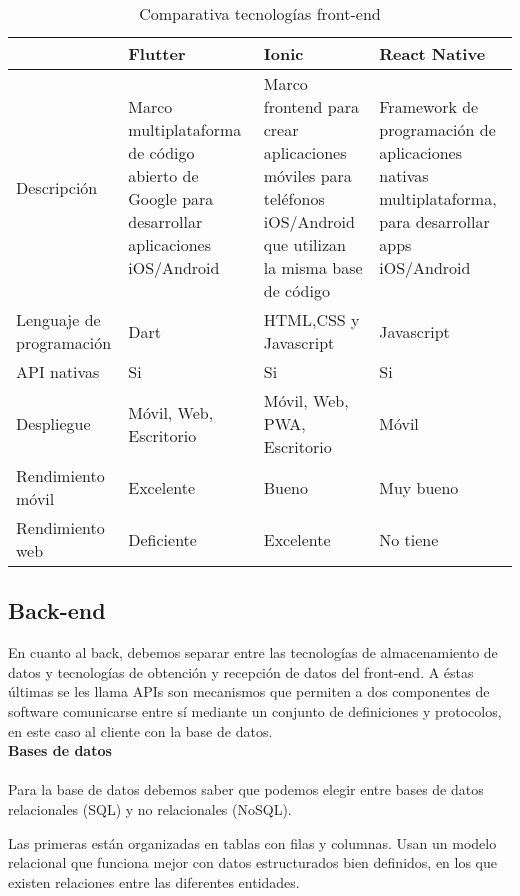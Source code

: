 \begin{table}[H] %
    \centering
    \begin{tabular}{|p{2cm} |p{4 cm} |p{4cm} |p{4cm} |} \hline 
         &  \textbf{Flutter}&  \textbf{Ionic}& \textbf{React Native}\\  \hline 
         Descripción &  Marco multiplataforma de código abierto de Google para desarrollar aplicaciones iOS/Android &  Marco frontend para crear aplicaciones móviles para teléfonos iOS/Android que utilizan la misma base de código& Framework de programación de aplicaciones nativas multiplataforma, para desarrollar apps iOS/Android\\ \hline 
         
        Lenguaje de programación &  Dart&  HTML,CSS y Javascript & Javascript\\ \hline 
        API nativas &  Si&  Si & Si\\ \hline 
        Despliegue &  Móvil, Web, Escritorio&  Móvil, Web, PWA, Escritorio & Móvil\\ \hline 
        Rendimiento móvil &  Excelente &  Bueno & Muy bueno\\ \hline 
        Rendimiento web &  Deficiente &  Excelente & No tiene\\ \hline 
    \end{tabular}
    \caption{Comparativa tecnologías front-end \cite{flut-ion} \cite{flut-react}}
    \label{tab:tec_front}
\end{table}

\subsection{Back-end}

En cuanto al back, debemos separar entre las tecnologías de almacenamiento de datos y tecnologías de obtención y recepción de datos del front-end. A éstas últimas se les llama APIs \cite{api} son mecanismos que permiten a dos componentes de software comunicarse entre sí mediante un conjunto de definiciones y protocolos, en este caso al cliente con la base de datos. \\

\textbf{Bases de datos} \\ \\
Para la base de datos debemos saber que podemos elegir entre bases de datos relacionales (SQL) y no relacionales (NoSQL).

Las primeras están organizadas en tablas con filas y columnas. Usan un modelo relacional que funciona mejor con datos estructurados bien definidos, en los que existen relaciones entre las diferentes entidades.

